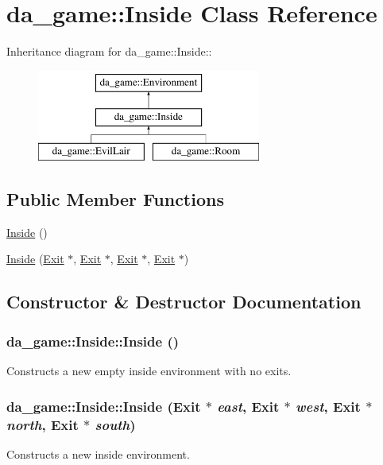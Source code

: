 \hypertarget{classda__game_1_1Inside}{
\section{da\_\-game::Inside Class Reference}
\label{classda__game_1_1Inside}
}
Inheritance diagram for da\_\-game::Inside::\begin{figure}[H]
\begin{center}
\leavevmode
\includegraphics[height=3cm]{classda__game_1_1Inside}
\end{center}
\end{figure}
\subsection*{Public Member Functions}
\begin{DoxyCompactItemize}
\item 
\hyperlink{classda__game_1_1Inside_a90752ab2ce2d5991185aba47e962befd}{Inside} ()
\item 
\hyperlink{classda__game_1_1Inside_aa36eb3ecd2ad203540866314d5392078}{Inside} (\hyperlink{classda__game_1_1Exit}{Exit} $\ast$, \hyperlink{classda__game_1_1Exit}{Exit} $\ast$, \hyperlink{classda__game_1_1Exit}{Exit} $\ast$, \hyperlink{classda__game_1_1Exit}{Exit} $\ast$)
\end{DoxyCompactItemize}


\subsection{Constructor \& Destructor Documentation}
\hypertarget{classda__game_1_1Inside_a90752ab2ce2d5991185aba47e962befd}{
\subsubsection[{Inside}]{\setlength{\rightskip}{0pt plus 5cm}da\_\-game::Inside::Inside ()}}
\label{classda__game_1_1Inside_a90752ab2ce2d5991185aba47e962befd}
Constructs a new empty inside environment with no exits. \hypertarget{classda__game_1_1Inside_aa36eb3ecd2ad203540866314d5392078}{
\subsubsection[{Inside}]{\setlength{\rightskip}{0pt plus 5cm}da\_\-game::Inside::Inside ({\bf Exit} $\ast$ {\em east}, \/  {\bf Exit} $\ast$ {\em west}, \/  {\bf Exit} $\ast$ {\em north}, \/  {\bf Exit} $\ast$ {\em south})}}
\label{classda__game_1_1Inside_aa36eb3ecd2ad203540866314d5392078}
Constructs a new inside environment.



